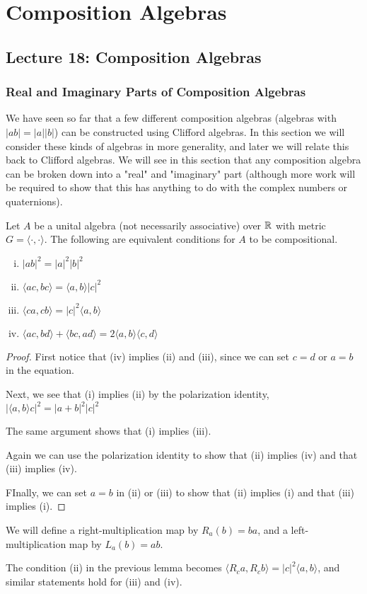 \section{Composition Algebras}
\subsection{Lecture 18: Composition Algebras}
\subsubsection{Real and Imaginary Parts of Composition Algebras}
We have seen so far that a few different composition algebras (algebras with $|ab|=|a||b|$) can be constructed using Clifford algebras. In this section we will consider these kinds of algebras in more generality, and later we will relate this back to Clifford algebras. We will see in this section that any composition algebra can be broken down into a "real" and "imaginary" part (although more work will be required to show that this has anything to do with the complex numbers or quaternions).

\begin{lemma}
    Let $A$ be a unital algebra (not necessarily associative) over $\operatorname{\mathbb{R}}$ with metric $G = \langle\cdot,\cdot\rangle$. The following are equivalent conditions for $A$ to be compositional.
    \begin{enumerate}[(i)]
    \item $|ab|^2 = |a|^2|b|^2$
    \item $\langle ac,bc\rangle = \langle a,b\rangle |c|^2$
    \item $\langle ca,cb\rangle = |c|^2 \langle a,b\rangle$
    \item $\langle ac,bd\rangle + \langle bc,ad\rangle = 2\langle a,b\rangle\langle c,d\rangle$
    \end{enumerate}
\end{lemma}
\begin{proof}
    First notice that (iv) implies (ii) and (iii), since we can set $c=d$ or $a=b$ in the equation.

    Next, we see that (i) implies (ii) by the polarization identity, $|\langle a,b\rangle c|^2 = |a+b|^2 |c|^2$

    The same argument shows that (i) implies (iii).

    Again we can use the polarization identity to show that (ii) implies (iv) and that (iii) implies (iv).

    FInally, we can set $a=b$ in (ii) or (iii) to show that (ii) implies (i) and that (iii) implies (i).
\end{proof}
\begin{defn}
    We will define a right-multiplication map by $R_a(b) = ba$, and a left-multiplication map by $L_a(b) = ab$.
\end{defn}
\begin{remark*}
    The condition (ii) in the previous lemma becomes $\langle R_c a,R_c b\rangle = |c|^2 \langle a,b\rangle$, and similar statements hold for (iii) and (iv).
\end{remark*}

